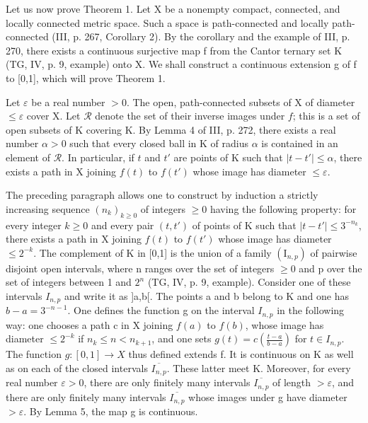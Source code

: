 Let us now prove Theorem 1. Let X be a nonempty compact, connected, and locally connected metric space. Such a space is path-connected and locally path-connected (III, p. 267, Corollary 2). By the corollary and the example of III, p. 270, there exists a continuous surjective map f from the Cantor ternary set K (TG, IV, p. 9, example) onto X. We shall construct a continuous extension g of f to {[}0,1{]}, which will prove Theorem 1.

Let \(\varepsilon\) be a real number \(>0\). The open, path-connected subsets of X of diameter \(\leqslant \varepsilon\) cover X. Let \(\mathcal{R}\) denote the set of their inverse images under \(f\); this is a set of open subsets of K covering K. By Lemma 4 of III, p. 272, there exists a real number \(\alpha > 0\) such that every closed ball in K of radius \(\alpha\) is contained in an element of \(\mathcal{R}\). In particular, if \(t\) and \(t'\) are points of K such that \(|t - t'| \leqslant \alpha\), there exists a path in X joining \(f(t)\) to \(f(t')\) whose image has diameter \(\leqslant \varepsilon\).

The preceding paragraph allows one to construct by induction a strictly increasing sequence \((n_{k})_{k\geqslant0}\) of integers \(\geqslant0\) having the following property: for every integer \(k\geqslant0\) and every pair \((t,t')\) of points of K such that \(|t-t'| \leqslant3^{-n_{k}}\), there exists a path in X joining \(f(t)\) to \(f(t')\) whose image has diameter \(\leqslant2^{-k}\). The complement of K in {[}0,1{]} is the union of a family \((\mathrm{I}_{n,p})\) of pairwise disjoint open intervals, where n ranges over the set of integers \(\geqslant0\) and p over the set of integers between 1 and \(2^{n}\) (TG, IV, p. 9, example). Consider one of these intervals \(I_{n,p}\) and write it as {]}a,b{[}. The points a and b belong to K and one has \(b-a=3^{-n-1}\). One defines the function g on the interval \(I_{n,p}\) in the following way: one chooses a path c in X joining \(f(a)\) to \(f(b)\), whose image has diameter \(\leqslant2^{-k}\) if \(n_{k}\leqslant n<n_{k+1}\), and one sets \(g(t)=c(\frac{t-a}{b-a})\) for \(t\in I_{n,p}\). The function \(g\colon[0,1]\to X\) thus defined extends f. It is continuous on K as well as on each of the closed intervals \(\overline{I_{n,p}}\). These latter meet K. Moreover, for every real number \(\varepsilon>0\), there are only finitely many intervals \(\overline{I_{n,p}}\) of length \(>\varepsilon\), and there are only finitely many intervals \(\overline{I_{n,p}}\) whose images under g have diameter \(>\varepsilon\). By Lemma 5, the map g is continuous.
\relax{}
